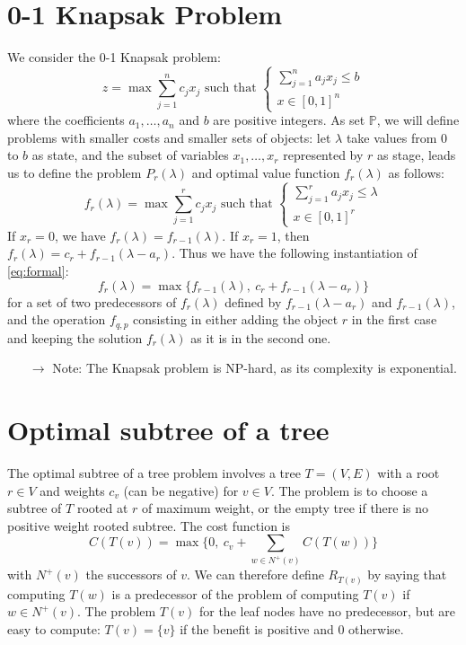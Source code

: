 \documentclass[11pt, openany]{report}
\theoremstyle{definition}
\begin{document}
\section{0-1 Knapsak Problem}
We consider the 0-1 Knapsak problem:
\begin{equation}
    z = \max\sum_{j=1}^n c_jx_j \text{   such that   } \begin{cases}
        \sum_{j=1}^n a_jx_j\le b\\ x\in [0,1]^n
    \end{cases}
\end{equation}
where the coefficients $a_1,\dots,a_n$ and $b$ are positive integers. As set $\mathbb{P}$, we will define problems with smaller costs and smaller sets of objects: let $\lambda$ take values from $0$ to $b$ as state, and the subset of variables $x_1,\dots,x_r$ represented by $r$ as stage, leads us to define the problem $P_r(\lambda)$ and optimal value function $f_r(\lambda)$ as follows:
\begin{equation}
    f_r(\lambda) = \max \sum_{j=1}^r c_jx_j \text{   such that   } \begin{cases}
        \sum_{j=1}^r a_jx_j\le \lambda\\ x\in [0,1]^r
    \end{cases}
\end{equation}
If $x_r=0$, we have $f_r(\lambda)=f_{r-1}(\lambda)$. If $x_r=1$, then $f_r(\lambda) = c_r + f_{r-1}(\lambda - a_r)$. Thus we have the following instantiation of \eqref{eq:formal}:
\begin{equation}
    f_r(\lambda) = \max\{f_{r-1}(\lambda),\:c_r + f_{r-1}(\lambda - a_r)\}
\end{equation}
for a set of two predecessors of $f_r(\lambda)$ defined by $f_{r-1}(\lambda - a_r)$ and $f_{r-1}(\lambda)$, and the operation $f_{q,p}$ consisting in either adding the object $r$ in the first case and keeping the solution $f_r(\lambda)$ as it is in the second one. 
\begin{itemize}
    \item [\(\rightarrow\)] Note: The Knapsak problem is NP-hard, as its complexity is exponential.
\end{itemize}
\section{Optimal subtree of a tree}
The optimal subtree of a tree problem involves a tree $T=(V,E)$ with a root $r\in V$ and weights $c_v$ (can be negative) for $v\in V$. The problem is to choose a subtree of $T$ rooted at $r$ of maximum weight, or the empty tree if there is no positive weight rooted subtree. The cost function is
\begin{equation}
    C(T(v)) = \max\{0, \: c_v+\sum_{w\in N^+(v)} C(T(w))\}
\end{equation}
with $N^+(v)$ the successors of $v$. We can therefore define $R_{T(v)}$ by saying that computing $T(w)$ is a predecessor of the problem of computing $T(v)$ if $w\in N^+(v)$. The problem $T(v)$ for the leaf nodes have no predecessor, but are easy to compute: $T(v)=\{v\}$ if the benefit is positive and 0 otherwise. 
\end{document}
